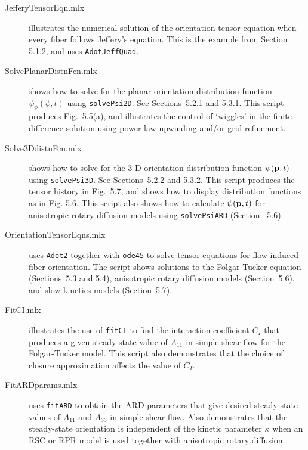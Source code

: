 \documentclass[11pt]{article}
\begin{document}
\begin{description}    

        \item[JefferyTensorEqn.mlx]{illustrates the numerical solution of the orientation tensor equation when every fiber follows Jeffery's equation.  This is the example from Section 5.1.2, and uses \texttt{AdotJeffQuad}.}    

        \item[SolvePlanarDistnFcn.mlx]{shows how to solve for the planar orientation distribution function $\psi_\phi (\phi, t)$ using \texttt{solvePsi2D}.  See Sections~5.2.1 and 5.3.1.  This script produces Fig.~5.5(a), and illustrates the control of `wiggles' in the finite difference solution using power-law upwinding and/or grid refinement.}    

        \item[Solve3DdistnFcn.mlx]{shows how to solve for the 3-D orientation distribution function $\psi (\mathbf{p}, t)$  using \texttt{solvePsi3D}.  See Sections~5.2.2 and 5.3.2.  This script produces the tensor history in Fig.~5.7, and shows how to display distribution functions as in Fig. 5.6.  This script also shows how to calculate $\psi(\mathbf{p}, t)$ for anisotropic rotary diffusion models using \texttt{solvePsiARD} (Section~ 5.6).  }    

        \item[OrientationTensorEqns.mlx]{uses \texttt{Adot2} together with \texttt{ode45} to solve tensor equations for flow-induced fiber orientation.  The script shows solutions to the Folgar-Tucker equation (Sections~5.3 and 5.4), anisotropic rotary diffusion models (Section~5.6), and slow kinetics models (Section~5.7).}    
 
        \item[FitCI.mlx]{illustrates the use of \texttt{fitCI} to find the interaction coefficient $C_I$ that produces a given steady-state value of $A_{11}$ in simple shear flow for the Folgar-Tucker model.  This script also demonstrates that the choice of closure approximation affects the value of $C_I$.}   
 
        \item[FitARDparams.mlx]{uses \texttt{fitARD} to obtain the ARD parameters that give desired steady-state values of $A_{11}$ and $A_{33}$ in simple shear flow.  Also demonstrates that the steady-state orientation is independent of the kinetic parameter $\kappa$ when an RSC or RPR model is used together with anisotropic rotary diffusion.}   
        
\end{description}
\end{document}
